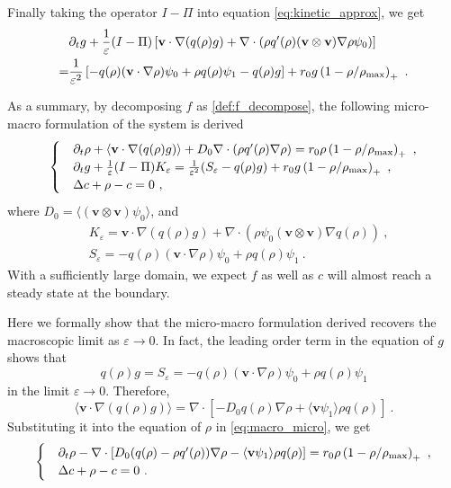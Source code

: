 \documentclass[review,onefignum,onetabnum]{siamart220329}
\newcommand {\bv} { {\mathbf{v}} }
\newcommand {\p}   {\partial}
\begin{document}
Finally taking the operator $I-\Pi$ into equation \cref{eq:kinetic_approx}, we get
\begin{align*}
    &\p_t g + \frac{1}{\varepsilon} (I-\Pi)\left[\bv \cdot \nabla (q(\rho)g) + \nabla \cdot (\rho q'(\rho) (\bv\otimes\bv)\nabla\rho\psi_0)\right] \\
    = &\frac{1}{\varepsilon^2}\left[- q(\rho)(\bv\cdot\nabla\rho)\psi_0+\rho q(\rho)\psi_1  - q(\rho) g\right] + r_0 g \left(1 - \rho/\rho_{\rm max}\right)_+\ .
\end{align*}

As a summary, by decomposing $f$ as \cref{def:f_decompose}, the following micro-macro formulation of the system is derived
\begin{align}\label{eq:macro_micro}
\begin{cases}
	&\p_t \rho +  \langle\bv\cdot \nabla (q(\rho) g)\rangle + { D_0 \nabla \cdot (\rho  q'(\rho)\nabla \rho)} =  r_0 \rho\left(1 - \rho/\rho_{\rm max}\right)_+\ , \\
	&\p_t g + \frac{1}{\varepsilon} (I-\Pi) K_\varepsilon = \frac{1}{\varepsilon^2}(S_\varepsilon - q(\rho)g) + r_0 g \left(1 - \rho/\rho_{\rm max}\right)_+\ ,\\
	&  \Delta c + \rho - c=0\ ,
\end{cases}
\end{align}
where $D_0 = \langle(\bv\otimes\bv)\psi_0\rangle$, and 
\begin{align*}
    & K_\varepsilon = \bv \cdot \nabla (q(\rho)g) + \nabla \cdot (\rho \psi_0(\bv\otimes\bv)\nabla q(\rho))\ , \\
    & S_\varepsilon = - q(\rho)(\bv\cdot\nabla\rho)\psi_0+\rho q(\rho)\psi_1\ .
\end{align*}
With a sufficiently large domain, we expect $f$ as well as $c$ will almost reach a steady state at the boundary. 


Here we formally show that the micro-macro formulation derived {recovers} the macroscopic limit as $\varepsilon\to 0$. 
In fact, the leading order term in the equation of $g$ shows that 
\begin{equation*}
    q(\rho)g = S_\varepsilon = - q(\rho)(\bv\cdot\nabla\rho)\psi_0+\rho q(\rho)\psi_1
\end{equation*}
in the limit $\varepsilon\to 0$. 
Therefore, 
\begin{equation*}
    \langle\bv\cdot \nabla (q(\rho) g)\rangle = \nabla \cdot \left[-D_0{q(\rho)\nabla\rho }+\langle\bv \psi_1\rangle\rho q(\rho)\right]\ .
\end{equation*}
Substituting it into the equation of $\rho$ in \cref{eq:macro_micro}, we get 
\begin{equation}
\label{eq:macro_proliferation}
\begin{cases}
    & \p_t \rho - \nabla \cdot \left[D_0({q(\rho)}-{\rho q'(\rho)})\nabla\rho - \langle\bv \psi_1\rangle\rho q(\rho)\right] = r_0 \rho\left(1 - \rho/\rho_{\rm max}\right)_+\ , \\
    &  \Delta c + \rho - c=0\ .
\end{cases}
\end{equation}
\end{document}
